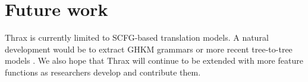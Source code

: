 \documentclass[11pt]{article}
\begin{document}
\section{Future work}

Thrax is currently limited to SCFG-based translation models.  A natural
development would be to extract GHKM grammars \cite{galley2004whats}
or more recent tree-to-tree models
\cite{zhang2008,liu2009,chiang2010}.  We also hope that Thrax will
continue to be extended with more feature functions as researchers
develop and contribute them.




\end{document}
